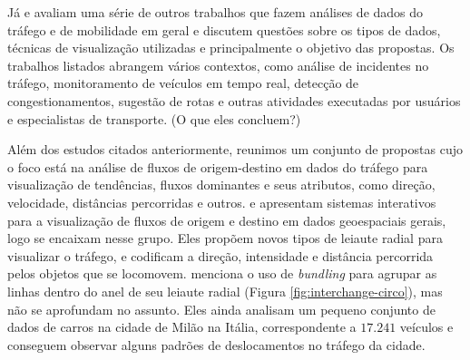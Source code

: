   Já \citet{Andrienko2017Visual} e \citet{Chen2015} avaliam uma série de outros
trabalhos que fazem análises de dados do tráfego e de mobilidade em geral e
discutem questões sobre os tipos de dados, técnicas de visualização utilizadas
e principalmente o objetivo das propostas. Os trabalhos listados abrangem
vários contextos, como análise de incidentes no tráfego, monitoramento de
veículos em tempo real, detecção de congestionamentos, sugestão de rotas e
outras atividades executadas por usuários e especialistas de transporte. (O que
eles concluem?)

  Além dos estudos citados anteriormente, reunimos um conjunto de propostas
cujo o foco está na análise de fluxos de origem-destino em dados do tráfego
para visualização de tendências, fluxos dominantes e seus atributos, como
direção, velocidade, distâncias percorridas e outros.  \citet{Zeng2013} e
\citet{Andrienko2017}  apresentam sistemas interativos para a visualização de
fluxos de origem e destino em dados geoespaciais gerais, logo se encaixam nesse
grupo. Eles propõem novos tipos de leiaute radial para visualizar o tráfego, e
codificam a direção, intensidade e distância percorrida pelos objetos que se
locomovem. \citet{Zeng2013} menciona o uso de \emph{bundling} para agrupar as
linhas dentro do anel de seu leiaute radial (Figura
\ref{fig:interchange-circo}), mas não se aprofundam no assunto.  Eles ainda
analisam um pequeno conjunto de dados de carros na cidade de Milão na Itália,
correspondente a $17.241$ veículos e conseguem observar alguns padrões de
deslocamentos no tráfego da cidade.

